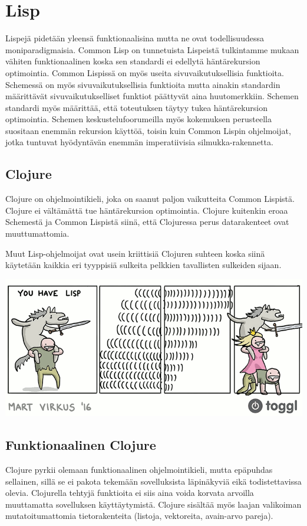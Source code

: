 \documentclass[12pt]{article}
\begin{document}
\newpage
\section{Lisp}
Lispejä pidetään yleensä funktionaalisina mutta ne ovat todellisuudessa moniparadigmaisia. Common Lisp on tunnetuista Lispeistä tulkintamme mukaan vähiten funktionaalinen koska sen standardi ei edellytä häntärekursion optimointia. Common Lispissä on myös useita sivuvaikutuksellisia funktioita. Schemessä on myös sivuvaikutuksellisia funktioita mutta ainakin standardin määrittävät sivuvaikutukselliset funktiot päättyvät aina huutomerkkiin. Schemen standardi myös määrittää, että toteutuksen täytyy tukea häntärekursion optimointia. Schemen keskustelufoorumeilla myös kokemuksen perusteella suositaan enemmän rekursion käyttöä, toisin kuin Common Lispin ohjelmoijat, jotka tuntuvat hyödyntävän enemmän imperatiivisia silmukka-rakennetta.

\subsection{Clojure}
Clojure on ohjelmointikieli, joka on saanut paljon vaikutteita Common Lispistä. Clojure ei vältämättä tue häntärekursion optimointia. Clojure kuitenkin eroaa Schemestä ja Common Lispistä siinä, että Clojuressa perus datarakenteet ovat muuttumattomia. 

Muut Lisp-ohjelmoijat ovat usein kriittisiä Clojuren suhteen koska siinä käytetään kaikkia eri tyyppisiä sulkeita pelkkien tavallisten sulkeiden sijaan.

\includegraphics[width=\textwidth]{sulkeet.png}

\subsection{Funktionaalinen Clojure}
Clojure pyrkii olemaan funktionaalinen ohjelmointikieli, mutta epäpuhdas sellainen, sillä se ei pakota tekemään sovelluksista läpinäkyviä eikä todistettavissa olevia. Clojurella tehtyjä funktioita ei siis aina voida korvata arvoilla muuttamatta sovelluksen käyttäytymistä. Clojure sisältää myös laajan valikoiman mutatoitumattomia tietorakenteita (listoja, vektoreita, avain-arvo pareja).
\end{document}
